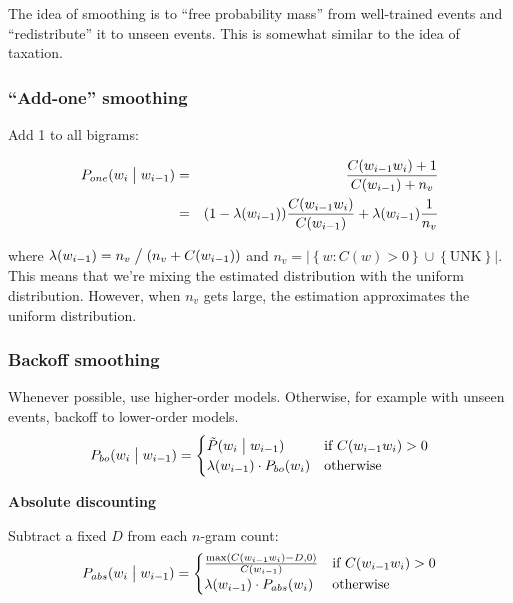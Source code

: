 \documentclass[11pt]{article}
\begin{document}
The idea of smoothing is to ``free probability mass'' from well-trained events and ``redistribute'' it to unseen events. This is somewhat similar to the idea of taxation.

\subsubsection{``Add-one'' smoothing}

Add 1 to all bigrams:

\begin{eqnarray*}
    P_{one}(w_i \bigm| w_{i - 1}) &=& \frac{C(w_{i-1}w_i)+1}{C(w_{i-1}) + n_v} \\
                                  &=& (1 - \lambda(w_{i-1})) \frac{C(w_{i-1}w_i)}{C(w_{i-1})} + \lambda(w_{i-1}) \frac{1}{n_v}
\end{eqnarray*}

where $\lambda(w_{i-1}) = n_v \bigm/ (n_v + C(w_{i-1}))$ and $n_v = \left|\left\{w : C(w) > 0 \right\} \cup \left\{\mbox{UNK} \right\}\right|$. This means that we're mixing the estimated distribution with the uniform distribution. However, when $n_v$ gets large, the estimation approximates the uniform distribution.

\subsubsection{Backoff smoothing}

Whenever possible, use higher-order models. Otherwise, for example with unseen events, backoff to lower-order models.
\begin{equation*}
    P_{bo}(w_i \bigm| w_{i-1}) = \begin{cases}
        \tilde{P}(w_i \bigm| w_{i-1}) & \mbox{if } C(w_{i-1}w_i) > 0 \\
        \lambda(w_{i-1}) \cdot P_{bo}(w_i) & \mbox{otherwise}
                                 \end{cases}
\end{equation*}

\vspace{20pt}
\textbf{Absolute discounting}
\vspace{10pt}

Subtract a fixed $D$ from each $n$-gram count:
\begin{equation*}
    P_{abs}(w_i \bigm| w_{i-1}) = \begin{cases}
        \frac{\max(C(w_{i-1}w_i)-D, 0)}{C(w_{i-1})} & \mbox{if } C(w_{i-1}w_i) > 0 \\
        \lambda(w_{i-1}) \cdot P_{abs}(w_i) & \mbox{otherwise}
                                 \end{cases}
\end{equation*}
\end{document}
